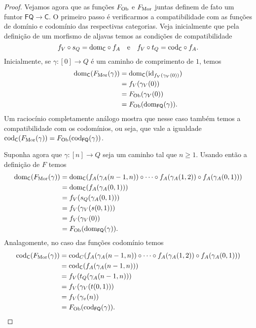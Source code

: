 \begin{proof}
    Vejamos agora que as funções $F_{\mathrm{Ob}}$ e $F_{\mathrm{Mor}}$ juntas definem de fato um funtor $\mathsf{FQ} \to \mathsf{C}$.
    O primeiro passo é verificarmos a compatibilidade com as funções de domínio e codomínio das respectivas categorias.
    Veja inicialmente que pela definição de um morfismo de aljavas temos as condições de compatibilidade
    \begin{displaymath}
        f_V \circ s_Q = \mathrm{dom}_{\mathsf{C}} \circ f_A
        \quad \text{e} \quad
        f_V \circ t_Q = \mathrm{cod}_{\mathsf{C}} \circ f_A.
    \end{displaymath}
    Inicialmente, se $\gamma: [0] \to Q$ é um caminho de comprimento de $1$, temos
    \begin{align*}
        \mathrm{dom}_{\mathsf{C}}(F_{\mathrm{Mor}}(\gamma))
        & = \mathrm{dom}_{\mathsf{C}}(\mathrm{id}_{f_V(\gamma_V(0))}) \\
        & = f_V(\gamma_V(0)) \\
        & = F_{\mathrm{Ob}}(\gamma_V(0)) \\
        & = F_{\mathrm{Ob}}(\mathrm{dom}_{\mathsf{FQ}}(\gamma)).
    \end{align*}
    Um raciocínio completamente análogo mostra que nesse caso também temos a compatibilidade com os codomínios, ou seja, que vale a igualdade $\mathrm{cod}_{\mathsf{C}}(F_{\mathrm{Mor}}(\gamma)) = F_{\mathrm{Ob}}(\mathrm{cod}_{\mathsf{FQ}}(\gamma))$.

    Suponha agora que $\gamma: [n] \to Q$ seja um caminho tal que $n \geq 1$.
    Usando então a definição de $F$ temos
    \begin{align*}
        \mathrm{dom}_{\mathsf{C}}(F_{\mathrm{Mor}}(\gamma))
        & = \mathrm{dom}_{\mathsf{C}}(f_A(\gamma_A(n-1,n)) \circ \dotsm \circ f_A(\gamma_A(1,2)) \circ f_A(\gamma_A(0,1))) \\
        & = \mathrm{dom}_{\mathsf{C}}(f_A(\gamma_A(0,1))) \\
        & = f_V(s_Q(\gamma_A(0,1))) \\
        & = f_V(\gamma_V(s(0,1))) \\
        & = f_V(\gamma_V(0)) \\
        & = F_{\mathrm{Ob}}(\mathrm{dom}_{\mathsf{FQ}}(\gamma)).
    \end{align*}
    Analagomente, no caso das funções codomínio temos
    \begin{align*}
        \mathrm{cod}_{\mathsf{C}}(F_{\mathrm{Mor}}(\gamma))
        & = \mathrm{cod}_{C}(f_A(\gamma_A(n-1,n)) \circ \dotsm \circ f_A(\gamma_A(1,2)) \circ f_A(\gamma_A(0,1))) \\
        & = \mathrm{cod}_{\mathsf{C}}(f_A(\gamma_A(n-1,n))) \\
        & = f_V(t_Q(\gamma_A(n-1,n))) \\
        & = f_V(\gamma_V(t(0,1))) \\
        & = f_V(\gamma_v(n)) \\
        & = F_{\mathrm{Ob}}(\mathrm{cod}_{\mathsf{FQ}}(\gamma)).
    \end{align*}


\end{proof}
